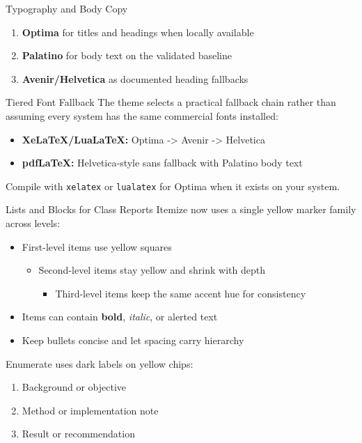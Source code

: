 \documentclass[aspectratio=169]{beamer}
\begin{document}
\begin{frame}{Typography and Body Copy}
  \begin{enumerate}
    \item \textbf{Optima} for titles and headings when locally available
    \item \textbf{Palatino} for body text on the validated baseline
    \item \textbf{Avenir/Helvetica} as documented heading fallbacks
  \end{enumerate}

  \vskip 10pt
  \begin{exampleblock}{Tiered Font Fallback}
    The theme selects a practical fallback chain rather than assuming every system has
    the same commercial fonts installed:
    \begin{itemize}
      \item \textbf{XeLaTeX/LuaLaTeX:} Optima -> Avenir -> Helvetica
      \item \textbf{pdfLaTeX:} Helvetica-style sans fallback with Palatino body text
    \end{itemize}
  \end{exampleblock}

  \vskip 6pt
  \footnotesize
  \textcolor{UPBlack80}{Compile with \texttt{xelatex} or \texttt{lualatex} for Optima when it exists on your system.}
\end{frame}

\begin{frame}{Lists and Blocks for Class Reports}
  Itemize now uses a single yellow marker family across levels:

  \begin{itemize}
    \item First-level items use \textcolor{UPYellow}{yellow} squares
    \begin{itemize}
      \item Second-level items stay yellow and shrink with depth
      \begin{itemize}
        \item Third-level items keep the same accent hue for consistency
      \end{itemize}
    \end{itemize}
    \item Items can contain \textbf{bold}, \emph{italic}, or \alert{alerted} text
    \item Keep bullets concise and let spacing carry hierarchy
  \end{itemize}

  \vskip 8pt
  Enumerate uses dark labels on yellow chips:
  \begin{enumerate}
    \item Background or objective
    \item Method or implementation note
    \item Result or recommendation
  \end{enumerate}
\end{frame}
\end{document}
